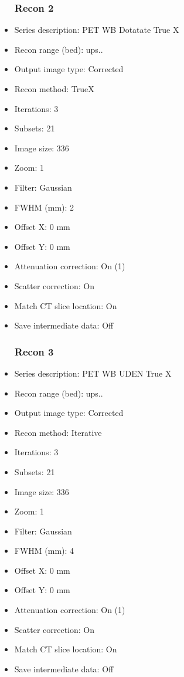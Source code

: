 \documentclass[12pt]{article}
\begin{document}
\begin{itemize}
\subsubsection{Recon 2}
\item Series description: PET WB Dotatate True X
\item Recon range (bed): ups..
\item Output image type: Corrected
\item Recon method: TrueX
\item Iterations: 3
\item Subsets: 21
\item Image size: 336
\item Zoom: 1
\item Filter: Gaussian
\item FWHM (mm): 2
\item Offset X: 0 mm
\item Offset Y: 0 mm
\item Attenuation correction: On (1)
\item Scatter correction: On
\item Match CT slice location: On
\item Save intermediate data: Off
\subsubsection{Recon 3}
\item Series description: PET WB UDEN True X
\item Recon range (bed): ups..
\item Output image type: Corrected
\item Recon method: Iterative
\item Iterations: 3
\item Subsets: 21
\item Image size: 336
\item Zoom: 1
\item Filter: Gaussian
\item FWHM (mm): 4
\item Offset X: 0 mm
\item Offset Y: 0 mm
\item Attenuation correction: On (1)
\item Scatter correction: On
\item Match CT slice location: On
\item Save intermediate data: Off

\end{itemize}
\end{document}
